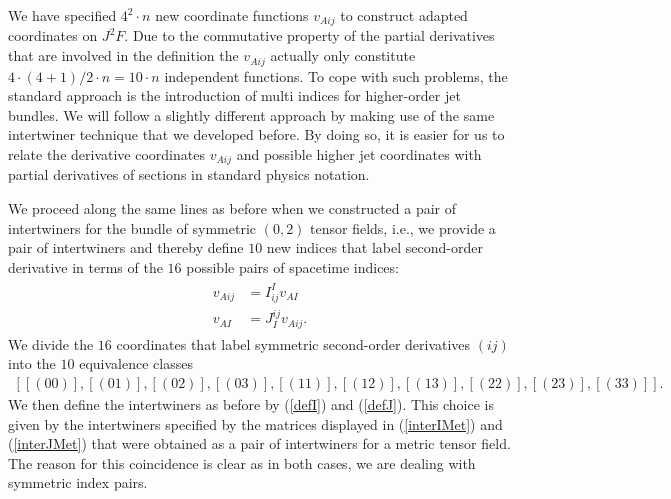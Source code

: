 \documentclass[a4paper,12pt, DIV=14, BCOR=5mm, twoside, headsepline, numbers=noenddot]{scrbook}
\begin{document}
We have specified $4^2\cdot n$ new coordinate functions $v_{Aij}$ to construct adapted coordinates on $J^2F$. Due to the commutative property of the partial derivatives that are involved in the definition the $v_{Aij}$ actually only constitute $4\cdot (4+1)/2 \cdot n = 10\cdot n$ independent functions. To cope with such problems, the standard approach is the introduction of multi indices for higher-order jet bundles. We will follow a slightly different approach by making use of the same intertwiner technique that we developed before. By doing so, it is easier for us to relate the derivative coordinates $v_{Aij}$ and possible higher jet coordinates with partial derivatives of sections in standard physics notation. 

We proceed along the same lines as before when we constructed a pair of intertwiners for the bundle of symmetric $(0,2)$ tensor fields, i.e., we provide a pair of intertwiners and thereby define $10$ new indices that label second-order derivative in terms of the $16$ possible pairs of spacetime indices:
\begin{align}
    \begin{aligned}
    v_{Aij} &= I^I_{ij} v_{AI}\\
    v_{AI} &= J_I^{ij} v_{Aij}.
    \end{aligned}
\end{align}
We divide the $16$ coordinates that label symmetric second-order derivatives $(ij)$ into the $10$ equivalence classes 
\begin{align}
    \left [[(00)],[(01)],[(02)],[(03)],[(11)],[(12)],[(13)],[(22)],[(23)],[(33)] \right ].
\end{align}
We then define the intertwiners as before by (\ref{defI}) and (\ref{defJ}). 
This choice is given by the intertwiners specified by the matrices displayed in (\ref{interIMet}) and (\ref{interJMet}) that were obtained as a pair of intertwiners for a metric tensor field. The reason for this coincidence is clear as in both cases, we are dealing with symmetric index pairs. 
\end{document}
